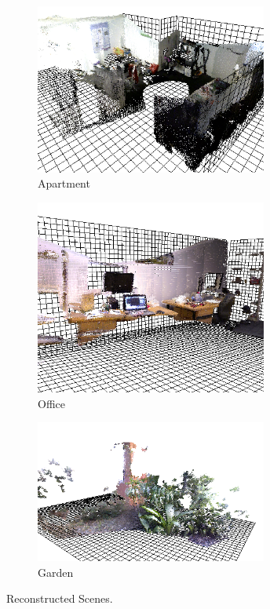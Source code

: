 \begin{figure}[!htb] 
        \centering
        \begin{subfigure}[b]{3.0in}
                \includegraphics[width=3.0in]{images/ch2/unit21}
                \caption{Apartment}
                \label{fig:RECON_UNIT}
        \end{subfigure}
        \begin{subfigure}[b]{3.0in}
                \includegraphics[width=3.0in]{images/ch2/officeA}
                \caption{Office}
                \label{fig:RECON_OFFICE}
        \end{subfigure}
        \begin{subfigure}[b]{3.0in}
                \includegraphics[width=3.0in]{images/ch2/outdoorA}
                \caption{Garden}
                \label{fig:RECON_GARDEN}
        \end{subfigure}
       \caption{Reconstructed Scenes.}
       \label{fig:RECONSTRUCTIONS}
\end{figure}

